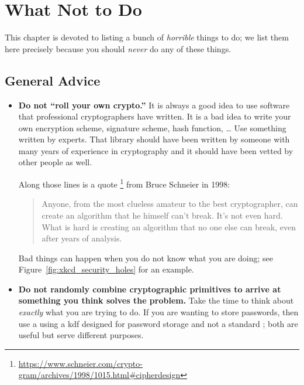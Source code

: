 \chapter{What Not to Do}
\label{chap:do_not}

This chapter is devoted to listing a bunch of \emph{horrible}
things to do;
we list them here precisely because you should \emph{never}
do any of these things.

\section{General Advice}

\begin{itemize}
\item \textbf{Do not ``roll your own crypto.''}
    It is always a good idea to use software that professional cryptographers
        have written.
    It is a bad idea to write your own \gls{encryption scheme},
        \gls{signature} scheme,
        \gls{hash function}, \dots
    Use something written by experts.
    That library should have been written by someone with many years
        of experience in cryptography and it should have been vetted
        by other people as well.

    Along those lines is a quote%
    \footnote{\url{https://www.schneier.com/crypto-gram/archives/1998/1015.html\#cipherdesign}}
    from Bruce Schneier in 1998:

\begin{quote}
    Anyone, from the most clueless amateur to the best cryptographer,
    can create an algorithm that he himself can't break.
    It's not even hard. What is hard is creating an algorithm
    that no one else can break, even after years of analysis.
\end{quote}

    Bad things can happen when you do not know what you are doing;
    see Figure~\ref{fig:xkcd_security_holes} for an example.



\item \textbf{Do not randomly combine cryptographic primitives
    to arrive at something you think solves the problem.}
    Take the time to think about \emph{exactly} what you are trying to do.
    If you are wanting to store passwords,
    then use a using a \gls{kdf} designed
    for password storage
    and not a standard ;
    both are useful but serve different purposes.


\end{itemize}
